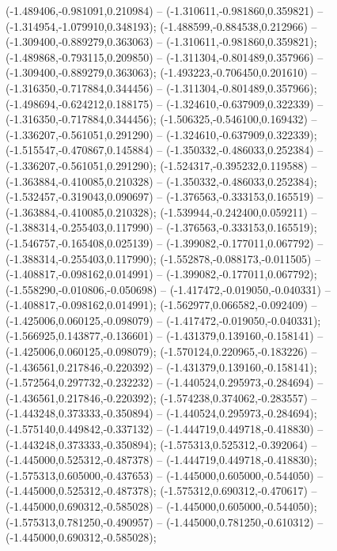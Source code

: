  (-1.489406,-0.981091,0.210984) -- (-1.310611,-0.981860,0.359821) -- (-1.314954,-1.079910,0.348193);
 (-1.488599,-0.884538,0.212966) -- (-1.309400,-0.889279,0.363063) -- (-1.310611,-0.981860,0.359821);
 (-1.489868,-0.793115,0.209850) -- (-1.311304,-0.801489,0.357966) -- (-1.309400,-0.889279,0.363063);
 (-1.493223,-0.706450,0.201610) -- (-1.316350,-0.717884,0.344456) -- (-1.311304,-0.801489,0.357966);
 (-1.498694,-0.624212,0.188175) -- (-1.324610,-0.637909,0.322339) -- (-1.316350,-0.717884,0.344456);
 (-1.506325,-0.546100,0.169432) -- (-1.336207,-0.561051,0.291290) -- (-1.324610,-0.637909,0.322339);
 (-1.515547,-0.470867,0.145884) -- (-1.350332,-0.486033,0.252384) -- (-1.336207,-0.561051,0.291290);
 (-1.524317,-0.395232,0.119588) -- (-1.363884,-0.410085,0.210328) -- (-1.350332,-0.486033,0.252384);
 (-1.532457,-0.319043,0.090697) -- (-1.376563,-0.333153,0.165519) -- (-1.363884,-0.410085,0.210328);
 (-1.539944,-0.242400,0.059211) -- (-1.388314,-0.255403,0.117990) -- (-1.376563,-0.333153,0.165519);
 (-1.546757,-0.165408,0.025139) -- (-1.399082,-0.177011,0.067792) -- (-1.388314,-0.255403,0.117990);
 (-1.552878,-0.088173,-0.011505) -- (-1.408817,-0.098162,0.014991) -- (-1.399082,-0.177011,0.067792);
 (-1.558290,-0.010806,-0.050698) -- (-1.417472,-0.019050,-0.040331) -- (-1.408817,-0.098162,0.014991);
 (-1.562977,0.066582,-0.092409) -- (-1.425006,0.060125,-0.098079) -- (-1.417472,-0.019050,-0.040331);
 (-1.566925,0.143877,-0.136601) -- (-1.431379,0.139160,-0.158141) -- (-1.425006,0.060125,-0.098079);
 (-1.570124,0.220965,-0.183226) -- (-1.436561,0.217846,-0.220392) -- (-1.431379,0.139160,-0.158141);
 (-1.572564,0.297732,-0.232232) -- (-1.440524,0.295973,-0.284694) -- (-1.436561,0.217846,-0.220392);
 (-1.574238,0.374062,-0.283557) -- (-1.443248,0.373333,-0.350894) -- (-1.440524,0.295973,-0.284694);
 (-1.575140,0.449842,-0.337132) -- (-1.444719,0.449718,-0.418830) -- (-1.443248,0.373333,-0.350894);
 (-1.575313,0.525312,-0.392064) -- (-1.445000,0.525312,-0.487378) -- (-1.444719,0.449718,-0.418830);
 (-1.575313,0.605000,-0.437653) -- (-1.445000,0.605000,-0.544050) -- (-1.445000,0.525312,-0.487378);
 (-1.575312,0.690312,-0.470617) -- (-1.445000,0.690312,-0.585028) -- (-1.445000,0.605000,-0.544050);
 (-1.575313,0.781250,-0.490957) -- (-1.445000,0.781250,-0.610312) -- (-1.445000,0.690312,-0.585028);
